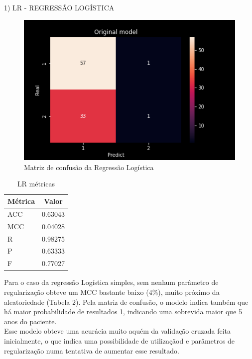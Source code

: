 \noindent \textcolor{deepblue}{1) LR - REGRESSÃO LOGÍSTICA}
\\
\begin{figure}[!h]
    \centering
    \includegraphics[width=\linewidth, scale=.6]{../../figuras/machine_learning/LR_MC.png}
    \caption{Matriz de confusão da Regressão Logística}
\end{figure}

\begin{table}[!h]
    \centering
    \begin{tabular}{lc}
        \rowcolor{pagecolor!50!COLOR1}
        \hline
        Métrica & Valor   \\\hline\hline
        ACC     & 0.63043 \\\hline
        MCC     & 0.04028 \\\hline
        R       & 0.98275 \\\hline
        P       & 0.63333 \\\hline
        F       & 0.77027
    \end{tabular}
    \caption{LR métricas}
\end{table}

Para o caso da regressão Logística simples, sem nenhum parâmetro de regularização obteve um MCC bastante baixo ($4\%$), muito próximo da aleatoriedade (Tabela 2). Pela matriz de confusão, o modelo indica também que há maior probabilidade de resultados 1, indicando uma sobrevida maior que 5 anos do paciente.\\

Esse modelo obteve uma acurácia muito aquém da validação cruzada feita inicialmente, o que indica uma possibilidade de utilizaçãod e parâmetros de regularização numa tentativa de aumentar esse resultado.
\\

